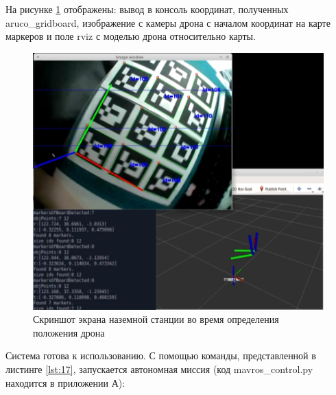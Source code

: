 На рисунке \ref{fig:px4} отображены: вывод в консоль координат, полученных aru\-co\_g\-rid\-board, изображение с камеры дрона с началом координат на карте маркеров и поле rviz с моделью дрона относительно карты.
\begin{figure}[H]
	\centering
	\includegraphics[width=0.7\linewidth]{pics/px4}
	\caption{ Скриншот экрана наземной станции во время определения положения дрона
	}
	\label{fig:px4}
\end{figure}

Система готова к использованию. С помощью команды, представленной в листинге \ref{lst:17}, запускается автономная миссия (код mavros\_control.py находится в приложении А):
\begin{Program}[H]
\caption{Команда запуска автономной миссии} \label{lst:17}
\end{Program}
